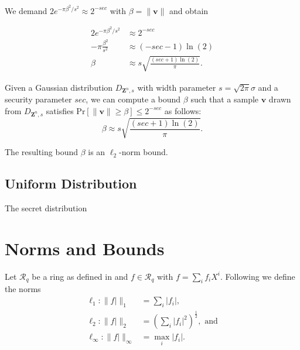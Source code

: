 We demand $2 e^{-\pi \beta^2/s^2} \approx 2^{-sec}$ with $\beta = \|\mathbf{v}\|$  and obtain

\begin{align*}
    2 e^{-\pi \beta^2/s^2}   & \approx 2^{-sec}                               \\
    -\pi \frac{\beta^2}{s^2} & \approx (-sec - 1)\ln (2)                      \\
    \beta                    & \approx s \sqrt{\frac{(sec + 1) \ln(2)}{\pi}}.
\end{align*}

\begin{theorem}
    Given a Gaussian distribution $D_{\mathbf{Z}^n, s}$ with width parameter $s  = \sqrt{2 \pi} \sigma$ and a security parameter $sec$, we can compute a bound $\beta$ such that a sample $\mathbf{v}$ drawn from $D_{\mathbf{Z}^n, s}$ satisfies $\text{Pr}\left[ \|\mathbf{v}\| \geq \beta \right] \leq 2^{-sec}$ as follows:
    \begin{equation}
        \beta  \approx s \sqrt{\frac{(sec + 1) \ln(2)}{\pi}}.
    \end{equation}
\end{theorem}

The resulting bound $\beta$ is an $\ell_2$-norm bound. %


\subsection{Uniform Distribution}
The secret distribution 



\section{Norms and Bounds} %
Let $\mathcal{R}_q$ be a ring as defined in \cite{BDLOP18} and $f \in \mathcal{R}_q$ with $f = \sum_i f_i X^i$. Following \cite{BDLOP18} we define the norms
\begin{align}
    \ell_1 : \| f| \|_1           & = \sum_i |f_i|,                                           \\
    \ell_2 : \| f| \|_2           & = \left(\sum_i |f_i|^2\right) ^{\frac{1}{2}}, \text{ and} \\
    \ell_\infty : \| f| \|_\infty & = \max_i |f_i|.
\end{align}

